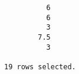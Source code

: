 \documentclass[11pt]{report}
\begin{document}
\begin{itemize}
\begin{verbatim}
          6                                                                                                                                                                                                                                                                                                                                                                                                                                                                                                          
          6                                                                                                                                                                                                                                                                                                                                                                                                                                                                                                          
          3                                                                                                                                                                                                                                                                                                                                                                                                                                                                                                          
        7.5                                                                                                                                                                                                                                                                                                                                                                                                                                                                                                          
          3                                                                                                                                                                                                                                                                                                                                                                                                                                                                                                          

19 rows selected.
  \end{verbatim}
\end{itemize}
\end{document}
